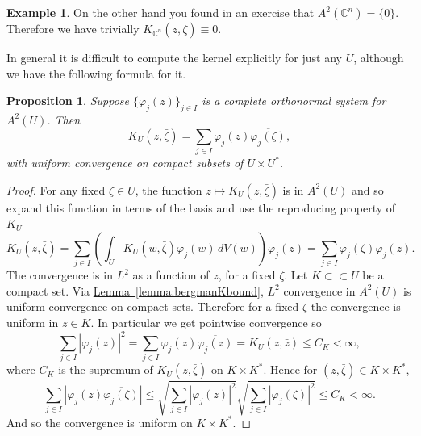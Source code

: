 \documentclass[12pt,openany]{book}
\newcommand{\abs}[1]{\left\lvert {#1} \right\rvert}
\newcommand{\C}{{\mathbb{C}}}
\theoremstyle{plain}
\newtheorem{prop}[thm]{Proposition}
\theoremstyle{remark}
\theoremstyle{definition}
\theoremstyle{exercise}
\theoremstyle{example}
\newtheorem{example}[thm]{Example}
\newcommand{\lemmaref}[1]{\hyperref[#1]{Lemma~\ref*{#1}}}
\begin{document}
\begin{example}
On the other hand you found in an exercise that $A^2(\C^n) = \{ 0 \}$.  Therefore we have trivially
$K_{\C^n}(z,\bar{\zeta}) \equiv 0$.
\end{example}

In general it is difficult to compute the kernel explicitly
for just any $U$, although we have the following formula for it.

\begin{prop}
Suppose $\{ \varphi_j (z) \}_{j\in I}$ is a complete orthonormal system
for $A^2(U)$.  Then
\begin{equation*}
K_U(z,\bar{\zeta})
=
\sum_{j \in I} \varphi_j(z) \overline{\varphi_j(\zeta)} ,
\end{equation*}
with uniform convergence on compact subsets of $U \times U^*$.
\end{prop}

\begin{proof}
For any fixed $\zeta \in U$, the function $z \mapsto K_U(z,\bar{\zeta})$ is
in $A^2(U)$ and so expand this function
in terms of the basis and use the reproducing property of $K_U$
\begin{equation*}
K_U(z,\bar{\zeta}) = 
\sum_{j \in I}
\left(\int_U K_U(w,\bar{\zeta}) \overline{\varphi_j(w)} \, dV(w) \right)
\varphi_j(z)
=
\sum_{j \in I}
\overline{\varphi_j(\zeta)}
\varphi_j(z) .
\end{equation*}
The convergence is in $L^2$ as a function of $z$, for a fixed $\zeta$.
Let $K \subset \subset U$ be a compact set.
Via \lemmaref{lemma:bergmanKbound}, $L^2$ convergence in $A^2(U)$ is uniform convergence on
compact sets.  Therefore for a fixed $\zeta$ the convergence is uniform in
$z \in K$.  In particular we get pointwise convergence so
\begin{equation*}
\sum_{j \in I}
\abs{
\varphi_j(z) 
}^2
=
\sum_{j \in I}
\varphi_j(z) 
\overline{\varphi_j(z)}
=
K_U(z,\bar{z})
\leq C_K < \infty ,
\end{equation*}
where $C_K$ is the supremum of $K_U(z,\bar{\zeta})$ on $K \times K^*$.
Hence for $(z,\bar{\zeta}) \in K \times K^*$,
\begin{equation*}
\sum_{j \in I}
\abs{
\varphi_j(z)
\overline{\varphi_j(\zeta)}
}
\leq
\sqrt{
\sum_{j \in I}
\abs{
\varphi_j(z)
}^2
}
\sqrt{
\sum_{j \in I}
\abs{
\varphi_j(\zeta)
}^2
}
\leq
C_K < \infty .
\end{equation*}
And so the convergence is uniform on $K \times K^*$.
\end{proof}
\end{document}
